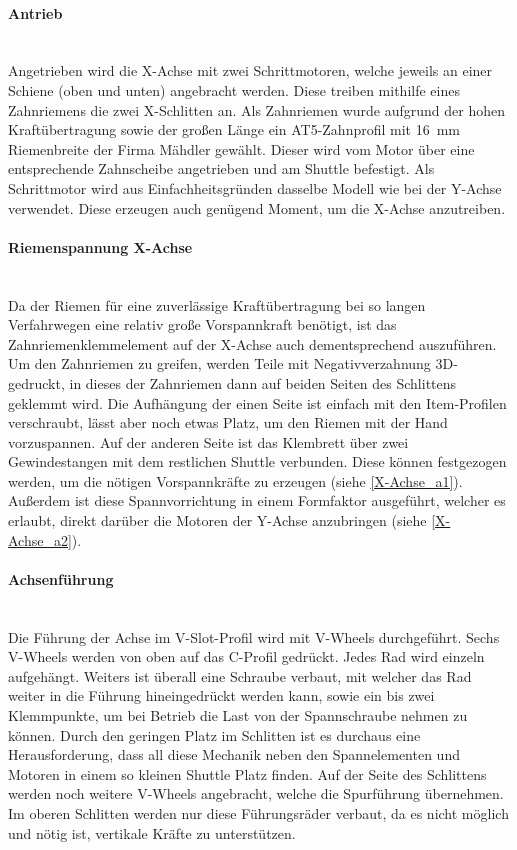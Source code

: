 \paragraph{Antrieb}\mbox{}\\
Angetrieben wird die X-Achse mit zwei Schrittmotoren, welche jeweils an einer Schiene (oben und unten) angebracht werden. Diese treiben mithilfe eines Zahnriemens die zwei X-Schlitten an. Als Zahnriemen wurde aufgrund der hohen Kraftübertragung sowie der großen Länge ein AT5-Zahnprofil mit \SI{16}{\mm} Riemenbreite der Firma Mähdler gewählt. Dieser wird vom Motor über eine entsprechende Zahnscheibe angetrieben und am Shuttle befestigt. Als Schrittmotor wird aus Einfachheitsgründen dasselbe Modell wie bei der Y-Achse verwendet. Diese erzeugen auch genügend Moment, um die X-Achse anzutreiben.

\paragraph{Riemenspannung X-Achse} \mbox{}\\
Da der Riemen für eine zuverlässige Kraftübertragung bei so langen Verfahrwegen eine relativ große Vorspannkraft benötigt, ist das Zahnriemenklemmelement auf der X-Achse auch dementsprechend auszuführen. Um den Zahnriemen zu greifen, werden Teile mit Negativverzahnung 3D-gedruckt, in dieses der Zahnriemen dann auf beiden Seiten des Schlittens geklemmt wird. Die Aufhängung der einen Seite ist einfach mit den Item-Profilen verschraubt, lässt aber noch etwas Platz, um den Riemen mit der Hand vorzuspannen. Auf der anderen Seite ist das Klembrett über zwei Gewindestangen mit dem restlichen Shuttle verbunden. Diese können festgezogen werden, um die nötigen Vorspannkräfte zu erzeugen (siehe \ref{X-Achse_a1}). Außerdem ist diese Spannvorrichtung in einem Formfaktor ausgeführt, welcher es erlaubt, direkt darüber die Motoren der Y-Achse anzubringen (siehe \ref{X-Achse_a2}).

\paragraph{Achsenführung} \mbox{}\\
Die Führung der Achse im V-Slot-Profil wird mit V-Wheels durchgeführt. Sechs V-Wheels werden von oben auf das C-Profil gedrückt. Jedes Rad wird einzeln aufgehängt. Weiters ist überall eine Schraube verbaut, mit welcher das Rad weiter in die Führung hineingedrückt werden kann, sowie ein bis zwei Klemmpunkte, um bei Betrieb die Last von der Spannschraube nehmen zu können. Durch den geringen Platz im Schlitten ist es durchaus eine Herausforderung, dass all diese Mechanik neben den Spannelementen und Motoren in einem so kleinen Shuttle Platz finden. Auf der Seite des Schlittens werden noch weitere V-Wheels angebracht, welche die Spurführung übernehmen.
Im oberen Schlitten werden nur diese Führungsräder verbaut, da es nicht möglich und nötig ist, vertikale Kräfte zu unterstützen.


